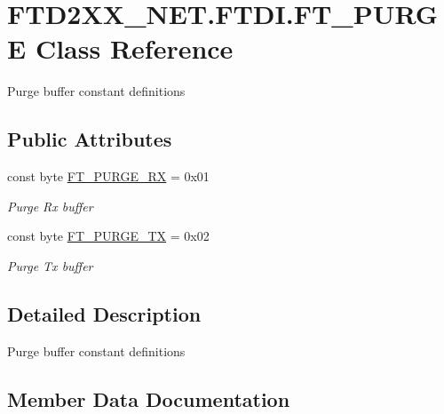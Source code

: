 \hypertarget{class_f_t_d2_x_x___n_e_t_1_1_f_t_d_i_1_1_f_t___p_u_r_g_e}{}\section{F\+T\+D2\+X\+X\+\_\+\+N\+E\+T.\+F\+T\+D\+I.\+F\+T\+\_\+\+P\+U\+R\+GE Class Reference}
\label{class_f_t_d2_x_x___n_e_t_1_1_f_t_d_i_1_1_f_t___p_u_r_g_e}


Purge buffer constant definitions  


\subsection*{Public Attributes}
\begin{DoxyCompactItemize}
\item 
const byte \mbox{\hyperlink{class_f_t_d2_x_x___n_e_t_1_1_f_t_d_i_1_1_f_t___p_u_r_g_e_a40eb7053fc10acaa90bb8a99a2ae5b26}{F\+T\+\_\+\+P\+U\+R\+G\+E\+\_\+\+RX}} = 0x01
\begin{DoxyCompactList}\small\item\em Purge Rx buffer \end{DoxyCompactList}\item 
const byte \mbox{\hyperlink{class_f_t_d2_x_x___n_e_t_1_1_f_t_d_i_1_1_f_t___p_u_r_g_e_aee820dc09c2fe3d0a4390d786428b42c}{F\+T\+\_\+\+P\+U\+R\+G\+E\+\_\+\+TX}} = 0x02
\begin{DoxyCompactList}\small\item\em Purge Tx buffer \end{DoxyCompactList}\end{DoxyCompactItemize}


\subsection{Detailed Description}
Purge buffer constant definitions 



\subsection{Member Data Documentation}
\mbox{\label{class_f_t_d2_x_x___n_e_t_1_1_f_t_d_i_1_1_f_t___p_u_r_g_e_a40eb7053fc10acaa90bb8a99a2ae5b26}} 
